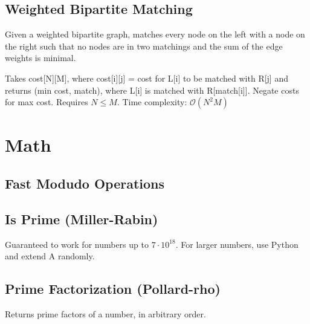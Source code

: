 \documentclass{article}
\begin{document}


\subsection*{Weighted Bipartite Matching}

Given a weighted bipartite graph, matches every node on the left with a node on the right such that no nodes
are in two matchings and the sum of the edge weights is minimal.

Takes cost[N][M], where cost[i][j] = cost for L[i] to be matched with R[j] and returns (min cost, match), where L[i] is matched with R[match[i]]. Negate costs for max cost. Requires $N \le M$.
Time complexity: $\mathcal{O}(N^2 M)$



\vspace*{2cm}

\section*{Math}

\subsection*{Fast Modudo Operations}


\newpage

\subsection*{Is Prime (Miller-Rabin)}
Guaranteed to work for numbers up to $7 \cdot 10^{18}$. For larger numbers, use Python and extend A randomly.
\begin{multicols}{2}
  
  \columnbreak
  
\end{multicols}

\subsection*{Prime Factorization (Pollard-rho)}
Returns prime factors of a number, in arbitrary order.
\begin{multicols}{2}
  
  \columnbreak
  
\end{multicols}
\end{document}
